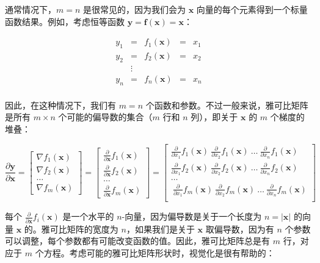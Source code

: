 \documentclass{ctexart}
\begin{document}
通常情况下，$m=n$ 是很常见的，因为我们会为 $\mathbf{x}$ 向量的每个元素得到一个标量函数结果。例如，考虑恒等函数 $\mathbf{y} = \mathbf{f(x)} = \mathbf{x}$：

\[\begin{array}{lclcc}
 y_1 & = & f_1(\mathbf{x})& = & x_1\\
 y_2 & = & f_2(\mathbf{x})& = & x_2\\
 & \vdots & \\
 y_n & = & f_n(\mathbf{x})& = & x_n\\
\end{array}\]

因此，在这种情况下，我们有 $m=n$ 个函数和参数。不过一般来说，雅可比矩阵是所有 $m \times n$ 个可能的偏导数的集合（$m$ 行和 $n$ 列），即关于 $\mathbf{x}$ 的 $m$ 个梯度的堆叠：

\[
\frac{\partial \mathbf{y}}{\partial \mathbf{x}} = \begin{bmatrix}
\nabla f_1(\mathbf{x}) \\
\nabla f_2(\mathbf{x})\\
\ldots\\
\nabla f_m(\mathbf{x})
\end{bmatrix} = \begin{bmatrix}
\frac{\partial}{\partial \mathbf{x}} f_1(\mathbf{x}) \\
\frac{\partial}{\partial \mathbf{x}} f_2(\mathbf{x})\\
\ldots\\
\frac{\partial}{\partial \mathbf{x}} f_m(\mathbf{x})
\end{bmatrix} = \begin{bmatrix}
\frac{\partial}{\partial {x_1}} f_1(\mathbf{x})~ \frac{\partial}{\partial {x_2}} f_1(\mathbf{x}) ~\ldots~ \frac{\partial}{\partial {x_n}} f_1(\mathbf{x}) \\
\frac{\partial}{\partial {x_1}} f_2(\mathbf{x})~ \frac{\partial}{\partial {x_2}} f_2(\mathbf{x}) ~\ldots~ \frac{\partial}{\partial {x_n}} f_2(\mathbf{x}) \\
\ldots\\
~\frac{\partial}{\partial {x_1}} f_m(\mathbf{x})~ \frac{\partial}{\partial {x_2}} f_m(\mathbf{x}) ~\ldots~ \frac{\partial}{\partial {x_n}} f_m(\mathbf{x}) \\
\end{bmatrix}
\]

每个 $\frac{\partial}{\partial \mathbf{x}} f_i(\mathbf{x})$ 是一个水平的 $n$-向量，因为偏导数是关于一个长度为 $n = |\mathbf{x}|$ 的向量 $\mathbf{x}$ 的。雅可比矩阵的宽度为 $n$，如果我们是关于 $\mathbf{x}$ 取偏导数，因为有 $n$ 个参数可以调整，每个参数都有可能改变函数的值。因此，雅可比矩阵总是有 $m$ 行，对应于 $m$ 个方程。考虑可能的雅可比矩阵形状时，视觉化是很有帮助的：
\end{document}
